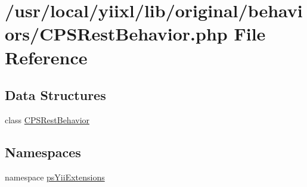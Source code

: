 \hypertarget{CPSRestBehavior_8php}{
\section{/usr/local/yiixl/lib/original/behaviors/CPSRestBehavior.php File Reference}
\label{CPSRestBehavior_8php}
}
\subsection*{Data Structures}
\begin{DoxyCompactItemize}
\item 
class \hyperlink{classCPSRestBehavior}{CPSRestBehavior}
\end{DoxyCompactItemize}
\subsection*{Namespaces}
\begin{DoxyCompactItemize}
\item 
namespace \hyperlink{namespacepsYiiExtensions}{psYiiExtensions}
\end{DoxyCompactItemize}
